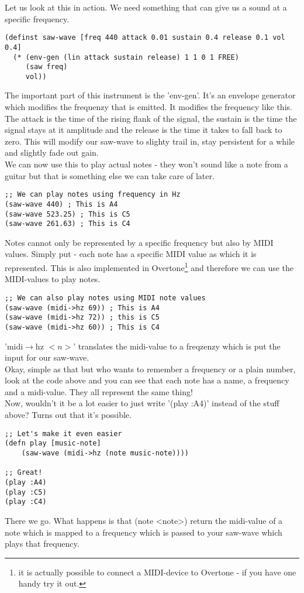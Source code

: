 Let us look at this in action. We need something that can give us a sound at a specific frequency. 

\begin{lstlisting}
(definst saw-wave [freq 440 attack 0.01 sustain 0.4 release 0.1 vol 0.4] 
  (* (env-gen (lin attack sustain release) 1 1 0 1 FREE)
     (saw freq)
     vol))
\end{lstlisting}
The important part of this instrument is the 'env-gen'. It's an envelope generator which modifies the frequenzy that is emitted. It modifies the frequency like this. The attack is the time of the rising flank of the signal, the sustain is the time the signal stays at it amplitude and the release is the time it takes to fall back to zero. This will modify our saw-wave to slighty trail in, stay persistent for a while and slightly fade out gain.\\
We can now use this to play actual notes - they won't sound like a note from a guitar but that is something else we can take care of later.
\begin{lstlisting}
;; We can play notes using frequency in Hz
(saw-wave 440) ; This is A4
(saw-wave 523.25) ; This is C5
(saw-wave 261.63) ; This is C4
\end{lstlisting}

Notes cannot only be represented by a specific frequency but also by \gls{MIDI} values. Simply put - each note has a specific MIDI value as which it is represented. This is also implemented in Overtone\footnote{it is actually possible to connect a MIDI-device to Overtone - if you have one handy try it out.} and therefore we can use the MIDI-values to play notes.
\begin{lstlisting}
;; We can also play notes using MIDI note values
(saw-wave (midi->hz 69)) ; This is A4
(saw-wave (midi->hz 72)) ; this is C5
(saw-wave (midi->hz 60)) ; This is C4
\end{lstlisting}
'midi$\rightarrow$hz $<n>$' translates the midi-value to a freqzenzy which is put the input for our saw-wave.\\
Okay, simple as that but who wants to remember a frequency or a plain number, look at the code above and you can see that each note has a name, a frequency and a midi-value. They all represent the same thing!\\ Now, wouldn't it be a lot easier to just write '(play :A4)' instead of the stuff above? Turns out that it's possible.
\begin{lstlisting}
;; Let's make it even easier
(defn play [music-note]
    (saw-wave (midi->hz (note music-note))))

;; Great!
(play :A4)
(play :C5)
(play :C4)
\end{lstlisting}
There we go. What happens is that (note <note>) return the midi-value of a note which is mapped to a frequency which is passed to your saw-wave which plays that frequency.\\

